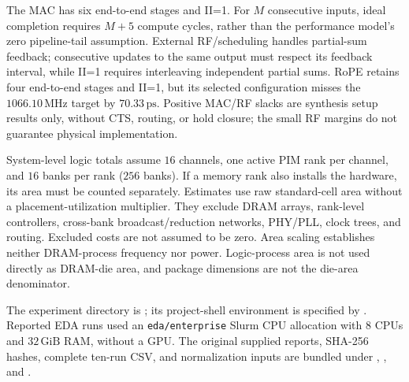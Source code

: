 The MAC has six end-to-end stages and II=1. For $M$ consecutive inputs, ideal completion requires $M+5$ compute cycles, rather than the performance model's zero pipeline-tail assumption. External RF/scheduling handles partial-sum feedback; consecutive updates to the same output must respect its feedback interval, while II=1 requires interleaving independent partial sums. RoPE retains four end-to-end stages and II=1, but its selected configuration misses the $1066.10\,\mathrm{MHz}$ target by $70.33\,\mathrm{ps}$. Positive MAC/RF slacks are synthesis setup results only, without CTS, routing, or hold closure; the small RF margins do not guarantee physical implementation.

System-level logic totals assume $16$ channels, one active PIM rank per channel, and $16$ banks per rank ($256$ banks). If a memory rank also installs the hardware, its area must be counted separately. Estimates use raw standard-cell area without a placement-utilization multiplier. They exclude DRAM arrays, rank-level controllers, cross-bank broadcast/reduction networks, PHY/PLL, clock trees, and routing. Excluded costs are not assumed to be zero. Area scaling establishes neither DRAM-process frequency nor power. Logic-process area is not used directly as DRAM-die area, and package dimensions are not the die-area denominator.

The experiment directory is ; its project-shell environment is specified by . Reported EDA runs used an \texttt{eda/enterprise} Slurm CPU allocation with 8 CPUs and $32\,\mathrm{GiB}$ RAM, without a GPU. The original supplied reports, SHA-256 hashes, complete ten-run CSV, and normalization inputs are bundled under , , and .
